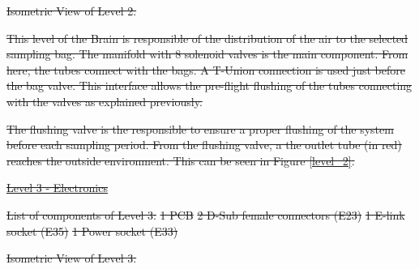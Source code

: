 \documentclass[a4paper,12pt,twoside]{article}
\providecommand{\DIFdeltex}[1]{{\protect\color{red}\sout{#1}}}                      %
\providecommand{\DIFdelFL}[1]{\DIFdel{#1}} %
\providecommand{\DIFdel}[1]{\texorpdfstring{\DIFdeltex{#1}}{}} %
\begin{document}
{%
\DIFdelFL{Isometric View of Level 2.}}

\DIFdel{This level of the Brain is responsible of the distribution of the air to the selected sampling bag. The manifold with 8 solenoid valves is the main component. From here, the tubes connect with the bags. A T-Union connection is used just before the bag valve. This interface allows the pre-flight flushing of the tubes connecting with the valves as explained previously. 
}%

\DIFdel{The flushing valve is the responsible to ensure a proper flushing of the system before each sampling period. From the flushing valve, a the outlet tube (in red) reaches the outside environment. This can be seen in Figure \ref{level_2}.
}%

\underline{\DIFdel{Level 3 - Electronics}}

\DIFdel{List of components of Level 3:
}%
\DIFdel{1 PCB
    }%
\DIFdel{2 D-Sub female connectors (E23)
    }%
\DIFdel{1 E-link socket (E35)
    }%
\DIFdel{1 Power socket (E33)
}%

{%
\DIFdelFL{Isometric View of Level 3.}}
\end{document}
